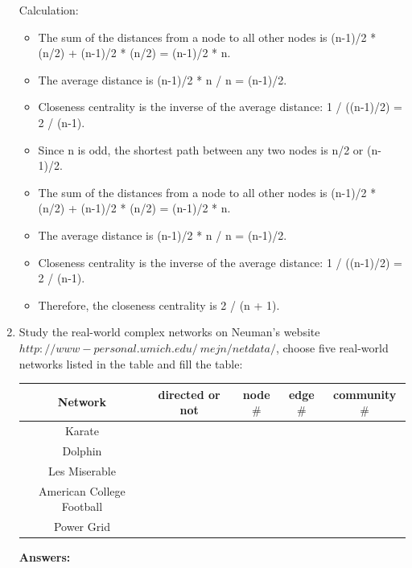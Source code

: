 \documentclass{amsart}
\theoremstyle{definition}
\theoremstyle{remark}
\numberwithin{equation}{section}
\begin{document}
\begin{enumerate}
Calculation:
\begin{itemize}
    \item The sum of the distances from a node to all other nodes is (n-1)/2 * (n/2) + (n-1)/2 * (n/2) = (n-1)/2 * n.
    \item The average distance is (n-1)/2 * n / n = (n-1)/2.
    \item Closeness centrality is the inverse of the average distance: 1 / ((n-1)/2) = 2 / (n-1).
    \item Since n is odd, the shortest path between any two nodes is n/2 or (n-1)/2.
    \item The sum of the distances from a node to all other nodes is (n-1)/2 * (n/2) + (n-1)/2 * (n/2) = (n-1)/2 * n.
    \item The average distance is (n-1)/2 * n / n = (n-1)/2.
    \item Closeness centrality is the inverse of the average distance: 1 / ((n-1)/2) = 2 / (n-1).
    \item Therefore, the closeness centrality is 2 / (n + 1).
\end{itemize}


\clearpage
\item Study the real-world complex networks on Neuman's website $http://www-personal.umich.edu/~mejn/netdata/$, choose five real-world networks listed in the table and fill the table:

\begin{center}
\begin{tabular}{|c|c|c|c|c|}\hline
Network & directed or not  &node$ \#$	 & edge$ \#$ & community$ \# $ \\ \hline
Karate  & &  &  &   \\ \hline
Dolphin & &  &  &   \\ \hline
Les Miserable& &  &  &   \\ \hline
American College Football & &  &  &   \\ \hline
Power Grid & &  &  &   \\ \hline
\end{tabular}
\end{center}

\vspace{0.2cm}

\textbf{Answers:}

\vspace{5cm}
\clearpage


\end{enumerate}
\end{document}

